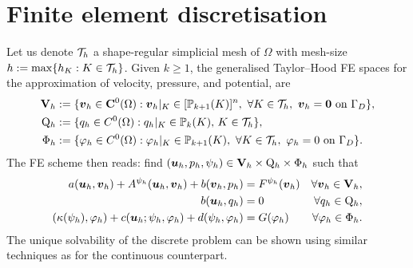 \section{Finite element discretisation}\label{sec:fem}
Let us denote $\mathcal{T}_h$ a shape-regular simplicial mesh of $\Omega$ with mesh-size $h:=\max\{h_K: K\in \mathcal{T}_h\}$. Given  $k\geq1$,  the generalised Taylor--Hood FE spaces for the approximation of velocity, pressure, and  potential, are 
	\begin{align*}
		\bV_h& :=\{\bv_h\in \bC^0(\Omega): \bv_h\vert_K\in[\mathbb{P}_{k+1}(K)]^n,\ \forall K\in\cT_h,\ \bv_h = \cero \ \text{on}\ \Gamma_D\},\\
		\rQ_h& :=\{q_h\in C^0(\Omega): q_h\vert_K\in \mathbb{P}_{k}(K),\,K\in\cT_h\},\\
		\Phi_h& :=\{\varphi_h\in C^0(\Omega): \varphi_h\vert_K\in \mathbb{P}_{k+1}(K),\ \forall K\in\cT_h,\ \varphi_h = 0 \ \text{on}\ \Gamma_D\}.%
		\end{align*}
The FE scheme then reads: find $(\boldsymbol{u}_h,p_h,\psi_h)\in \mathbf{V}_h\times \mathrm{Q}_h\times \Phi_h$ such that 
\begin{subequations}
\label{eq:weak-h}
\begin{align}
a(\bu_h, \bv_h) + A^{\psi_h}(\bu_h,\bv_h) + b(\bv_h,p_h) & = F^{\psi_h}(\bv_h) & \forall \bv_h \in \bV_h,\\
b(\bu_h, q_h) & = 0 & \forall q_h \in \rQ_h,\\
(\kappa(\psi_h),\varphi_h) + c(\bu_h; \psi_h, \varphi_h) + d(\psi_h,\varphi_h) & = G(\varphi_h) & \forall \varphi_h \in \Phi_{h}.%
\end{align}
\end{subequations}
The unique solvability of the discrete problem can be shown using similar techniques as for the continuous counterpart. %
